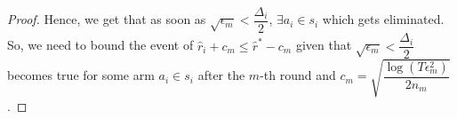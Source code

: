 \begin{proof}
\newline Hence, we get that as soon as $\sqrt{\epsilon_{m}}<\dfrac{\Delta_{i}}{2}$, $\exists a_{i}\in s_{i}$ which gets eliminated.
\newline So, we need to bound the event of $\hat{r}_{i}+c_{m}\leq \hat{r}^{*}-c_{m}$ given that $\sqrt{\epsilon_{m}}<\dfrac{\Delta_{i}}{2}$ becomes true for some arm $a_{i}\in s_{i}$ after the $m$-th round and $c_{m}=\sqrt{\dfrac{\log (T\epsilon_{m}^{2})}{2 n_{m}}}$.


\end{proof}
